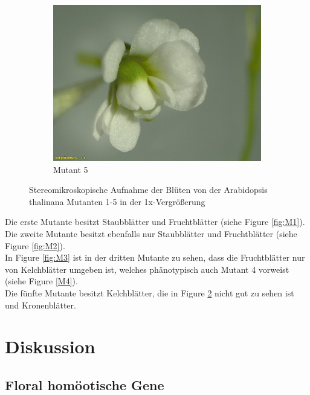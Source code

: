 \documentclass[10pt,a4paper]{article}
\begin{document}
\begin{figure}[H]
\begin{subfigure}[b]{0.45\textwidth}
				\includegraphics[width=\textwidth]{5_O+A(MU).jpg}
				\caption{Mutant 5}
				\label{fig:M5}
			\end{subfigure}
			\caption{Stereomikroskopische Aufnahme der Blüten von der Arabidopsis thalinana Mutanten 1-5 in der 1x-Vergrößerung}
		\end{figure}
		
		Die erste Mutante besitzt Staubblätter und Fruchtblätter (siehe Figure \ref{fig:M1}).
		Die zweite Mutante besitzt ebenfalls nur Staubblätter und Fruchtblätter (siehe Figure \ref{fig:M2}).\\
		In Figure \ref{fig:M3} ist in der dritten Mutante zu sehen, dass die Fruchtblätter nur von Kelchblätter umgeben ist, welches phänotypisch auch Mutant 4 vorweist (siehe Figure \ref{M4}).\\
		Die fünfte Mutante besitzt Kelchblätter, die in Figure \ref{fig:M5} nicht gut zu sehen ist und Kronenblätter.
		

	\section{Diskussion}
	
	\subsection{Floral homöotische Gene}
	
\end{document}
